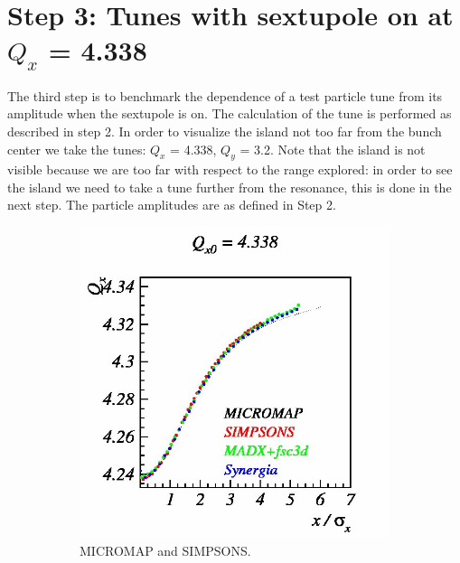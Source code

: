 \documentclass[a4paper]{cernatsnote}
\begin{document}
\section{Step 3: Tunes with sextupole on at $Q_x$ = 4.338}

The third step is to benchmark the dependence of a test particle tune from its amplitude when the sextupole is on. The calculation of the tune is performed as described in step 2. In order to visualize the island not too far from the bunch center we take the tunes: $Q_x$ = 4.338, $Q_y$ = 3.2. Note that the island is not visible because we are too far with respect to the range explored: in order to see the island we need to take a tune further from the resonance, this is done in the next step. The particle amplitudes are as defined in Step 2. 

\begin{figure}
        \centering
        \begin{subfigure}{.5\textwidth}
          \centering
          \includegraphics[width=\textwidth]{Step3_tune_x.png}
          \caption{MICROMAP and SIMPSONS.}
          \label{fig:step3H_m}
        \end{subfigure}~~~~~~
        \begin{subfigure}{.5\textwidth}
          \centering

\end{subfigure}
\end{figure}
\end{document}
